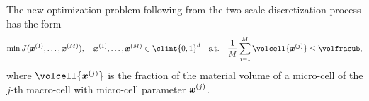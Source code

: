 The new optimization problem following from the
two-scale discretization process has the form
\begin{equation}
  \min J(\*x^{(1)}, \dotsc, \*x^{(M)}),\quad
  \*x^{(1)}, \dotsc, \*x^{(M)} \in \clint{0, 1}^d
  \quad\text{s.t.}\quad
  \frac{1}{M} \sum_{j=1}^M \volcell{\*x^{(j)}}
  \le \volfracub,
\end{equation}
where $\volcell{\*x^{(j)}}$ is the fraction of the material volume of a
micro-cell of the $j$-th macro-cell with micro-cell parameter ${\boldsymbol{x}}^{(j)}$.

\blindtext{}











































